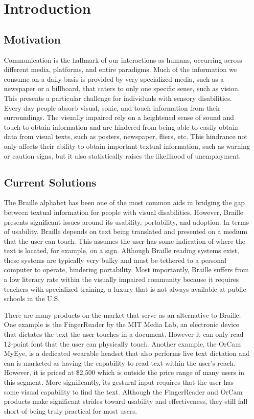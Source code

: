 \chapter{Introduction}

\section{Motivation}

Communication is the hallmark of our interactions as humans, occurring across different media, platforms, and entire paradigms. Much of the information we consume on a daily basis is provided by very specialized media, such as a newspaper or a billboard, that caters to only one specific sense, such as vision. This presents a particular challenge for individuals with sensory disabilities. Every day people absorb visual, sonic, and touch information from their surroundings. The visually impaired rely on a heightened sense of sound and touch to obtain information and are hindered from being able to easily obtain data from visual texts, such as posters, newspaper, fliers, etc. This hindrance not only affects their ability to obtain important textual information, such as warning or caution signs, but it also statistically raises the likelihood of unemployment.

\section{Current Solutions}

The Braille alphabet has been one of the most common aids in bridging the gap between textual information for people with visual disabilities. However, Braille presents significant issues around its usability, portability, and adoption. In terms of usability, Braille depends on text being translated and presented on a medium that the user can touch. This assumes the user has some indication of where the text is located, for example, on a sign. Although Braille reading systems exist, these systems are typically very bulky and must be tethered to a personal computer to operate, hindering portability. Most importantly, Braille suffers from a low literacy rate within the visually impaired community because it requires teachers with specialized training, a luxury that is not always available at public schools in the U.S.
	
There are many products on the market that serve as an alternative to Braille. One example is the FingerReader by the MIT Media Lab, an electronic device that dictates the text the user touches in a document. However it can only read 12-point font that the user can physically touch. Another example, the OrCam MyEye, is a dedicated wearable headset that also performs live text dictation and can is marketed as having the capability to read text within the user's reach. However, it is priced at \$2,500 which is outside the price range of many users in this segment. More significantly, its gestural input requires that the user has some visual capability to find the text. Although the FingerReader and OrCam products make significant strides toward usability and effectiveness, they still fall short of being truly practical for most users.

